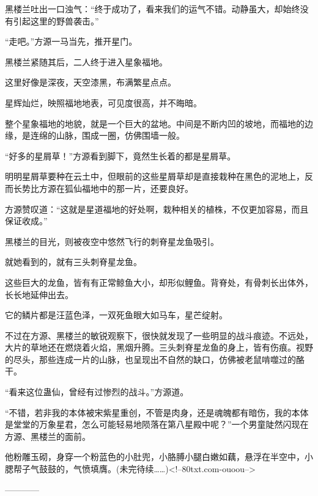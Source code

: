 \begin{this_body}
黑楼兰吐出一口浊气：“终于成功了，看来我们的运气不错。动静虽大，却始终没有引起这里的野兽袭击。”

“走吧。”方源一马当先，推开星门。

黑楼兰紧随其后，二人终于进入星象福地。

这里好像是深夜，天空漆黑，布满繁星点点。

星辉灿烂，映照福地地表，可见度很高，并不晦暗。

整个星象福地的地貌，就是一个巨大的盆地。中间是不断内凹的坡地，而福地的边缘，是连绵的山脉，围成一圈，仿佛围墙一般。

“好多的星屑草！”方源看到脚下，竟然生长着的都是星屑草。

明明星屑草要种在云土中，但眼前的这些星屑草却是直接栽种在黑色的泥地上，反而长势比方源在狐仙福地中的那一片，还要良好。

方源赞叹道：“这就是星道福地的好处啊，栽种相关的植株，不仅更加容易，而且保证收成。”

黑楼兰的目光，则被夜空中悠然飞行的刺脊星龙鱼吸引。

就她看到的，就有三头刺脊星龙鱼。

这些巨大的龙鱼，皆有有正常鲸鱼大小，却形似鲤鱼。背脊处，有骨刺长出体外，长长地延伸出去。

它的鳞片都是汪蓝色泽，一双死鱼眼大如马车，星芒绽射。

不过在方源、黑楼兰的敏锐观察下，很快就发现了一些明显的战斗痕迹。不远处，大片的草地还在燃烧着火焰，黑烟升腾。三头刺脊星龙鱼的身上，皆有伤痕。视野的尽头，那些连成一片的山脉，也呈现出不自然的缺口，仿佛被老鼠啃噬过的酪干。

“看来这位蛊仙，曾经有过惨烈的战斗。”方源道。

“不错，若非我的本体被宋紫星重创，不管是肉身，还是魂魄都有暗伤，我的本体是堂堂的万象星君，怎么可能轻易地陨落在第八星殿中呢？”一个男童陡然闪现在方源、黑楼兰的面前。

他粉雕玉砌，身穿一个粉蓝色的小肚兜，小胳膊小腿白嫩如藕，悬浮在半空中，小腮帮子气鼓鼓的，气愤填膺。(未完待续……)<!--80txt.com-ouoou-->

------------

\end{this_body}

